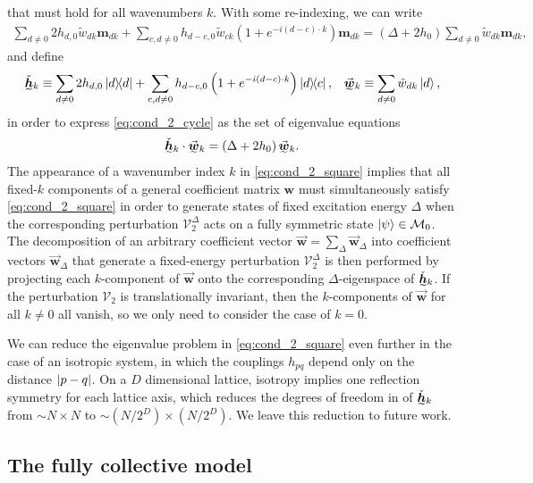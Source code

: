 \documentclass[nofootinbib,notitlepage,11pt]{revtex4-2}
\newcommand{\p}[1]{\left(#1\right)} %
\renewcommand{\c}{\cdot} %
\newcommand{\m}{\bm} %
\renewcommand{\v}{\vec} %
\newcommand{\1}{\mathds{1}}
\newcommand{\M}{\mathcal{M}}
\newcommand{\V}{\mathcal{V}}
\newcommand{\ut}{\undertilde}
\begin{document}
that must hold for all wavenumbers $k$.  With some re-indexing, we can
write
\begin{align}
  \sum_{d\ne0} 2 h_{d,0} \tilde w_{dk} \m m_{dk}
  + \sum_{c,d\ne0} h_{d-c,0} \tilde w_{ck}
  \p{1 + e^{-i\p{d-c}\c k}} \m m_{dk}
  = \p{\Delta + 2 h_0} \sum_{d\ne0} \tilde w_{dk} \m m_{dk},
  \label{eq:cond_2_cycle}
\end{align}
and define
\begin{align}
  \ut{\check{\m h}}_k
  \equiv \sum_{d\ne0} 2 h_{d,0} \op{d}
  + \sum_{c,d\ne0} h_{d-c,0} \p{1+e^{-i\p{d-c}\c k}} \op{d}{c},
  &&
  \ut{\v{\m w}}_k \equiv \sum_{d\ne0} \tilde w_{dk} \ket{d},
  \label{eq:cycle_vecs}
\end{align}
in order to express \eqref{eq:cond_2_cycle} as the set of eigenvalue
equations
\begin{align}
  \ut{\check{\m h}}_k \c \ut{\v{\m w}}_k
  = \p{\Delta + 2 h_0} \ut{\v{\m w}}_k.
  \label{eq:cond_2_square}
\end{align}
The appearance of a wavenumber index $k$ in \eqref{eq:cond_2_square}
implies that all fixed-$k$ components of a general coefficient matrix
$\m w$ must simultaneously satisfy \eqref{eq:cond_2_square} in order
to generate states of fixed excitation energy $\Delta$ when the
corresponding perturbation $\V_2^\Delta$ acts on a fully symmetric
state $\ket\psi\in\M_0$.  The decomposition of an arbitrary
coefficient vector $\v{\m w}=\sum_\Delta\v{\m w}_\Delta$ into
coefficient vectors $\v{\m w}_\Delta$ that generate a fixed-energy
perturbation $\V_2^\Delta$ is then performed by projecting each
$k$-component of $\v{\m w}$ onto the corresponding $\Delta$-eigenspace
of $\ut{\check{\m h}}_k$.  If the perturbation $\V_2$ is
translationally invariant, then the $k$-components of $\v{\m w}$ for
all $k\ne 0$ all vanish, so we only need to consider the case of
$k=0$.

We can reduce the eigenvalue problem in \eqref{eq:cond_2_square} even
further in the case of an isotropic system, in which the couplings
$h_{pq}$ depend only on the distance $\abs{p-q}$.  On a $D$
dimensional lattice, isotropy implies one reflection symmetry for each
lattice axis, which reduces the degrees of freedom in of
$\ut{\check{\m h}}_k$ from $\sim N\times N$ to
$\sim\p{N/2^D}\times\p{N/2^D}$.  We leave this reduction to future
work.

\subsection{The fully collective model}
\end{document}
